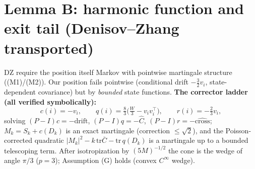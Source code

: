 \documentclass[11pt]{article}
\begin{document}
\section{Lemma B: harmonic function and exit tail (Denisov--Zhang transported)}
DZ \cite{DZ} require the position itself Markov with pointwise martingale structure
((M1)/(M2)). Our position fails pointwise (conditional drift $-\tfrac32v_i$,
state-dependent covariance) but by \emph{bounded} state functions. \textbf{The corrector
ladder (all verified symbolically):}
$$c(i)=-v_i,\qquad q(i)=\tfrac83\big(\tfrac W3-v_iv_i^\top\big),\qquad r(i)=-\tfrac23v_i,$$
solving $(P-I)c=-\mathrm{drift}$, $(P-I)q=-\widehat C$, $(P-I)r=-\widehat{\mathrm{cross}}$;
$M_k=S_k+c(D_k)$ is an exact martingale (correction $\le\sqrt2$), and the Poisson-corrected
quadratic $|M_k|^2-k\,\mathrm{tr}\bar C-\mathrm{tr}\,q(D_k)$ is a martingale up to a bounded
telescoping term. After isotropization by $(5M)^{-1/2}$ the cone is the wedge of angle
$\pi/3$ ($p=3$); Assumption (G) holds (convex $C^\infty$ wedge).
\end{document}
